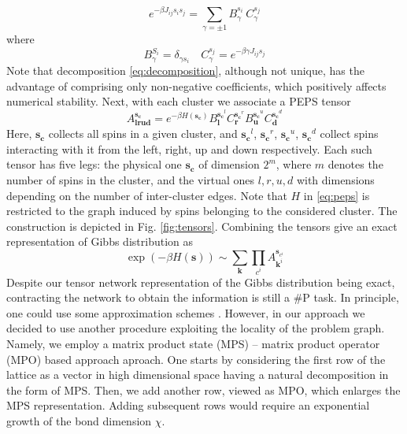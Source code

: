 \begin{equation}
  e^{-\beta J_{ij}s_i s_j} = \sum_{\gamma = \pm 1} B^{s_{i\phantom{j}}}_\gamma C^{s_j}_\gamma
\end{equation}
where
\begin{equation}
  \label{eq:decomposition}
  B^{S_i}_\gamma = \delta_{\gamma s_i} \quad C^{s_j}_\gamma = e^{-\beta \gamma J_{ij} s_j}
\end{equation}
Note that decomposition \eqref{eq:decomposition}, although not unique, has the
advantage of comprising only non-negative coefficients, which positively
affects numerical stability. Next, with each cluster we associate a PEPS tensor
\begin{equation}
  \label{eq:peps}
  A^{\mathbf{s_c}}_{\mathbf{lrud}} = e^{-\beta H(\mathbf{s_c})} B^{\mathbf{s_c}^l}_\mathbf{l}C^{\mathbf{s_c}^r}_\mathbf{r}B^{\mathbf{s_c}^u}_\mathbf{u}C^{\mathbf{s_c}^d}_\mathbf{d}
\end{equation}
Here, $\mathbf{s_c}$ collects all spins in a given cluster, and
  $\mathbf{s_c}^l$, $\mathbf{s_c}^r$, $\mathbf{s_c}^u$, $\mathbf{s_c}^d$ collect
    spins interacting with it from the left, right, up and down respectively. Each
    such tensor has five legs: the physical one $\mathbf{s_c}$ of dimension $2^m$,
    where $m$ denotes the number of spins in the cluster, and the virtual ones $l,
  r, u, d$ with dimensions depending on the number of inter-cluster edges. Note
    that $H$ in \eqref{eq:peps} is restricted to the graph induced by spins
belonging to the considered cluster. The construction is depicted in Fig.
\ref{fig:tensors}. Combining the tensors give an exact representation of Gibbs
distribution as
\begin{equation}
  \exp(-\beta H(\mathbf{s})) \sim \sum_{\mathbf{k}}\prod_{c^{i}}A_{\mathbf{k}^{i}}^{\mathbf{s}_{c^{i}}}
\end{equation}
Despite our tensor network representation of the Gibbs distribution being exact,
contracting the network to obtain the information is still a \#P task. In
principle, one could use some approximation schemes \cite{}. However, in our
approach we decided to use another procedure exploiting the locality of the
problem graph. Namely, we employ a matrix product state (MPS) -- matrix product operator (MPO)
based approach \cite{} aproach. One starts by considering the first row of the lattice
as a vector in high dimensional space having a natural decomposition in the form of MPS.
Then, we add another row, viewed as MPO, which enlarges the MPS representation. Adding
subsequent rows would require an exponential growth of the bond dimension $\chi$.
